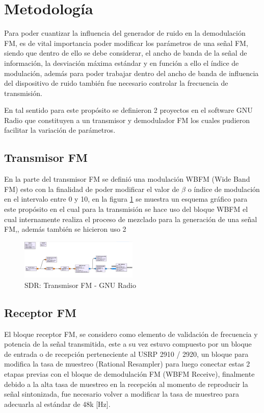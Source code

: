 \documentclass[conference]{IEEEtran}
\begin{document}
	
	\section{ Metodología }
	
	Para poder cuantizar la influencia del generador de ruido en la demodulación FM, es de vital importancia poder modificar los parámetros de una señal FM, siendo que dentro de ello se debe considerar, el ancho de banda de la señal de información, la desviación máxima estándar y en función a ello el índice de modulación, además para poder trabajar dentro del ancho de banda de influencia del dispositivo de ruido también fue necesario controlar la frecuencia de transmisión.
	
	En tal sentido para este propósito se definieron 2 proyectos en el software GNU Radio que constituyen a un transmisor y demodulador FM los cuales pudieron facilitar la variación de parámetros.
	
	\subsection{ Transmisor FM }
	
	En la parte del transmisor FM se definió una modulación WBFM (Wide Band FM) esto con la finalidad de poder modificar el valor de $\beta$ o índice de modulación en el intervalo entre 0 y 10, en la figura \ref{fig:transmisor-fm} se muestra un esquema gráfico para este propósito en el cual para la transmisión se hace uso del bloque WBFM el cual internamente realiza el proceso de mezclado para la generación de una señal FM,, además también se hicieron uso  2
	
	
	\begin{figure}[h]
		\centering
		\includegraphics[width=0.5\textwidth]{media/transmisor-fm}
		\caption{SDR: Transmisor FM - GNU Radio}
		\label{fig:transmisor-fm}
	\end{figure}
	
	
	\subsection{ Receptor FM }
	
	El bloque receptor FM, se considero como elemento de validación de frecuencia y potencia de la señal transmitida, este a su vez estuvo compuesto por un bloque de entrada o de recepción perteneciente al USRP 2910 / 2920, un bloque para modifica la tasa de muestreo (Rational Resampler) para luego conectar estas 2 etapas previas con el bloque de demodulación FM (WBFM Receive), finalmente debido a la alta tasa de muestreo en la recepción al momento de reproducir la señal sintonizada, fue necesario volver a modificar la tasa de muestreo para adecuarla al estándar de 48k [Hz].
	
\end{document}
